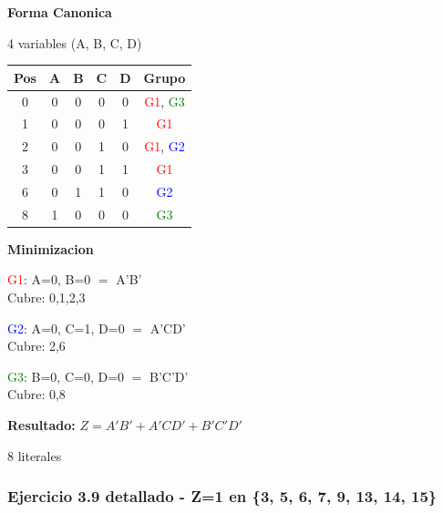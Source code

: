 \documentclass[12pt,a4paper]{article}
\begin{document}
\begin{minipage}[t]{0.58\textwidth}
\textbf{Forma Canonica}

4 variables (A, B, C, D)

\begin{tabular}{|c|c|c|c|c|c|}
\hline
Pos & A & B & C & D & Grupo \\
\hline
0 & 0 & 0 & 0 & 0 & \textcolor{red}{G1}, \textcolor{green}{G3} \\
1 & 0 & 0 & 0 & 1 & \textcolor{red}{G1} \\
2 & 0 & 0 & 1 & 0 & \textcolor{red}{G1}, \textcolor{blue}{G2} \\
3 & 0 & 0 & 1 & 1 & \textcolor{red}{G1} \\
6 & 0 & 1 & 1 & 0 & \textcolor{blue}{G2} \\
8 & 1 & 0 & 0 & 0 & \textcolor{green}{G3} \\
\hline
\end{tabular}
\end{minipage}
\hspace{0.3cm}
\begin{minipage}[t]{0.38\textwidth}
\textbf{Minimizacion}

\vspace{0.2cm}
\textcolor{red}{G1}: A=0, B=0 $=$ A'B' \\ Cubre: 0,1,2,3

\vspace{0.2cm}
\textcolor{blue}{G2}: A=0, C=1, D=0 $=$ A'CD' \\ Cubre: 2,6

\vspace{0.2cm}
\textcolor{green}{G3}: B=0, C=0, D=0 $=$ B'C'D' \\ Cubre: 0,8

\vspace{0.3cm}
\textbf{Resultado:} $Z = A'B' + A'CD' + B'C'D'$

8 literales
\end{minipage}

\vspace{0.5cm}

\subsubsection{Ejercicio 3.9 detallado - Z=1 en \{3, 5, 6, 7, 9, 13, 14, 15\}}

\vspace{0.3cm}
\end{document}
